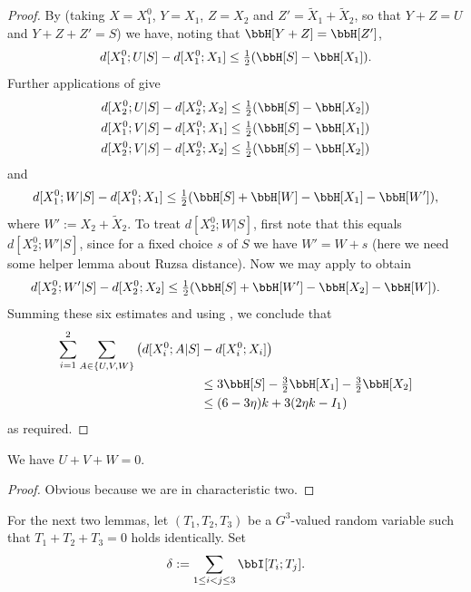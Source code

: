 \begin{proof}\leanok
  By  (taking $X = X_1^0$, $Y = X_1$, $Z = X_2$ and $Z' = \tilde X_1 + \tilde X_2$, so that $Y + Z = U$ and $Y + Z + Z' = S$) we have, noting that $\bbH[Y+ Z] = \bbH[Z']$,
  \[
    d[X^0_1;U|S] - d[X^0_1;X_1] \leq \tfrac{1}{2} (\bbH[S] -  \bbH[X_1]).
  \]
  Further applications of  give
  \begin{align*}
  d[X^0_2;U|S] - d[X^0_2; X_2] &\leq \tfrac{1}{2} (\bbH[S] -  \bbH[X_2]) \\
  d[X^0_1;V|S] - d[X^0_1;X_1] &\leq \tfrac{1}{2} (\bbH[S] -  \bbH[X_1])\\
  d[X^0_2;V|S] - d[X^0_2;X_2] &\leq \tfrac{1}{2} (\bbH[S] -  \bbH[X_2])
  \end{align*}
  and
  \[d[X^0_1;W|S] - d[X^0_1;X_1] \leq \tfrac{1}{2} (\bbH[S] + \bbH[W] - \bbH[X_1] - \bbH[W']),\] where $W' := X_2 + \tilde X_2$.
  To treat $d[X^0_2;W|S]$, first note that this equals $d[X^0_2;W'|S]$, since for a fixed choice $s$ of $S$ we have $W' = W + s$ (here we need some helper lemma about Ruzsa distance). Now we may apply  to obtain
  \[d[X^0_2;W'|S] - d[X^0_2;X_2] \leq \tfrac{1}{2} (\bbH[S] + \bbH[W'] - \bbH[X_2] - \bbH[W]).\]
  Summing these six estimates and using , we conclude that
  \begin{align*}
    \sum_{i=1}^2 \sum_{A\in\{U,V,W\}} \big(d[X^0_i;A|S] & - d[X^0_i;X_i]\big) \\
      &\leq 3 \bbH[S] - \tfrac{3}{2} \bbH[X_1] - \tfrac{3}{2} \bbH[X_2]\\
      &\leq (6 - 3\eta) k + 3(2 \eta k - I_1)
  \end{align*}
  as required.
\end{proof}

\begin{lemma}\label{key-ident}
\leanok
We have $U+V+W=0$.
\end{lemma}

\begin{proof} \leanok Obvious because we are in characteristic two.
\end{proof}

For the next two lemmas, let $(T_1,T_2,T_3)$ be a $G^3$-valued random variable such that $T_1+T_2+T_3=0$ holds identically. Set
\begin{equation}\label{delta-t1t2t3-def}
  \delta := \sum_{1 \leq i < j \leq 3} \bbI[T_i;T_j].
\end{equation}


